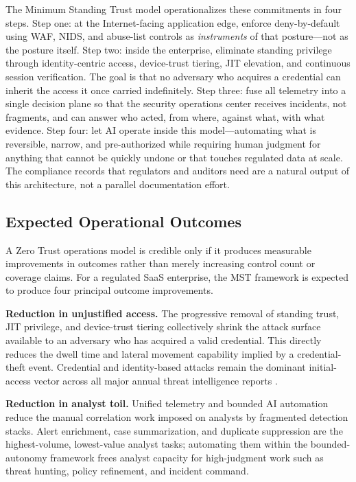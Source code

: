 \documentclass[unnumsec,webpdf,contemporary,large]{oup-authoring-template}
\theoremstyle{thmstyleone}
\theoremstyle{thmstyletwo}
\theoremstyle{thmstylethree}
\begin{document}
The Minimum Standing Trust model operationalizes these commitments in four steps.
Step one: at the Internet-facing application edge, enforce deny-by-default using WAF,
NIDS, and abuse-list controls as \textit{instruments} of that posture---not as the
posture itself. Step two: inside the enterprise, eliminate standing privilege through
identity-centric access, device-trust tiering, JIT elevation, and continuous session
verification. The goal is that no adversary who acquires a credential can inherit the
access it once carried indefinitely. Step three: fuse all telemetry into a single
decision plane so that the security operations center receives incidents, not
fragments, and can answer who acted, from where, against what, with what evidence.
Step four: let AI operate inside this model---automating what is reversible, narrow,
and pre-authorized while requiring human judgment for anything that cannot be quickly
undone or that touches regulated data at scale. The compliance records that regulators
and auditors need are a natural output of this architecture, not a parallel
documentation effort.

\subsection{Expected Operational Outcomes}

A Zero Trust operations model is credible only if it produces measurable improvements
in outcomes rather than merely increasing control count or coverage claims. For a regulated
SaaS enterprise, the MST framework is expected to produce four principal outcome improvements.

\textbf{Reduction in unjustified access.} The progressive removal of standing trust,
JIT privilege, and device-trust tiering collectively shrink the attack surface available
to an adversary who has acquired a valid credential. This directly reduces the dwell time
and lateral movement capability implied by a credential-theft event. Credential and
identity-based attacks remain the dominant initial-access vector across all major annual
threat intelligence reports \cite{verizon2025, crowdstrike2025, ciscotalos2025}.

\textbf{Reduction in analyst toil.} Unified telemetry and bounded AI automation reduce
the manual correlation work imposed on analysts by fragmented detection stacks. Alert
enrichment, case summarization, and duplicate suppression are the highest-volume, lowest-value
analyst tasks; automating them within the bounded-autonomy framework frees analyst capacity
for high-judgment work such as threat hunting, policy refinement, and incident command.
\end{document}
